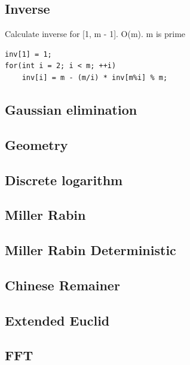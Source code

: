\documentclass[a4paper, 12pt, oneside, landscape]{article}
\begin{document}
\begin{multicols}{2}
    \subsection{Inverse}
    Calculate inverse for [1, m - 1]. O(m). m is prime
    \begin{lstlisting}
inv[1] = 1;
for(int i = 2; i < m; ++i)
    inv[i] = m - (m/i) * inv[m%i] % m;
    \end{lstlisting}
    
	\subsection{Gaussian elimination}
		    

	\subsection{Geometry}
	
	
	\subsection{Discrete logarithm}
	
	
	\subsection{Miller Rabin}
	
	
	\subsection{Miller Rabin Deterministic}
	

	\subsection{Chinese Remainer}
	
	
	\subsection{Extended Euclid}
	

	\subsection{FFT}
	


\end{multicols}
\end{document}
